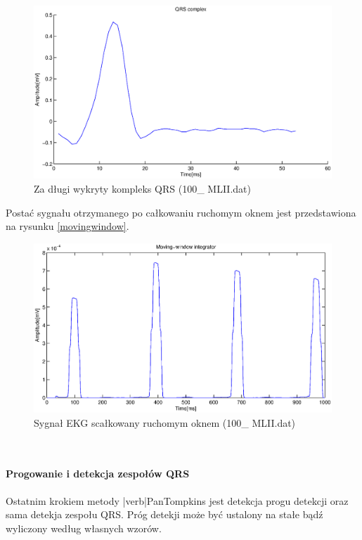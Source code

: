 \documentclass[a4paper, 11pt]{article}
\begin{document}
\begin{figure}
\centering
\includegraphics[scale=0.3]{include/qrslong.eps}
\caption{Za długi wykryty kompleks QRS (100\_ MLII.dat)}
\label{qrslong}
\end{figure}
\newpage
\indent Postać sygnału otrzymanego po całkowaniu ruchomym oknem jest przedstawiona na rysunku \eqref{movingwindow}.\\
\begin{figure}
\centering
\includegraphics[scale=0.5]{include/movingwindow.eps}
\caption{Sygnał EKG scałkowany ruchomym oknem (100\_ MLII.dat)}
\label{movingwindow}
\end{figure}\\
\paragraph{Progowanie i detekcja zespołów QRS}
Ostatnim krokiem metody |verb|PanTompkins jest detekcja progu detekcji oraz sama detekja zespołu QRS. Próg detekji może być ustalony na stałe bądź wyliczony według własnych wzorów.
\end{document}
